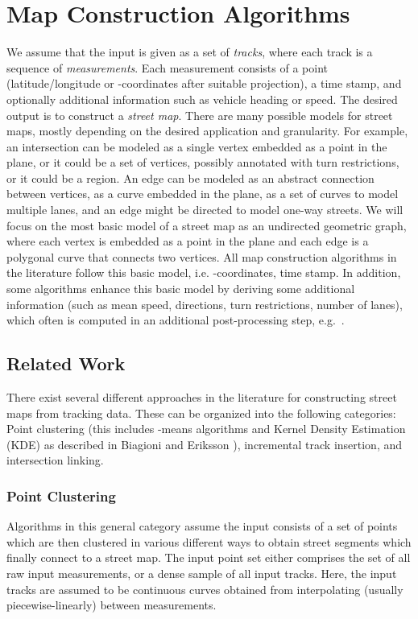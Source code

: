 \documentclass[natbib]{svjour3}                    \smartqed  \usepackage[table]{xcolor}
\begin{document}
\section{Map Construction Algorithms}
\label{sec:sec_mca}

We assume that the input is given as a set of {\em tracks}, where each track is a sequence of {\em measurements}. Each measurement consists of a point (latitude/longitude or -coordinates after suitable projection), a time stamp, and optionally additional information such as vehicle heading or speed. The desired output is to construct a {\em street map}. There are many possible models for street maps, mostly depending on the desired application and granularity. For example, an intersection can be modeled as a single vertex embedded as a point in the plane, or it could be a set of vertices, possibly annotated with turn restrictions, or it could be a region. An edge can be modeled as an abstract connection between vertices, as a curve embedded in the plane, as a set of curves to model multiple lanes, and an edge might be directed to model one-way streets. We will focus on the most basic model of a street map as an undirected geometric graph, where each vertex is embedded as a point in the plane and each edge is a polygonal curve that connects two vertices. All map construction algorithms in the literature follow this basic model, i.e. -coordinates, time stamp.  In addition, some algorithms enhance this basic model by deriving some additional information (such as mean speed, directions, turn restrictions, number of lanes), which often is computed in an additional post-processing step, e.g.~\cite{Biagioni:2012:MIF:2424321.2424333, Cao:2009:GTR:1653771.1653776, Davies:2006:SDR:1175887.1176088, edelkamp:2003:rpmi, schroedl:2004:mgtm}.

\subsection{Related Work}
There exist several different approaches in the literature for constructing street maps from tracking data. These can be organized into the following categories: Point clustering (this includes -means algorithms and Kernel Density Estimation (KDE) as described in Biagioni and Eriksson \cite{Biagioni:2012:MIF:2424321.2424333}), incremental track insertion, and intersection linking.

\subsubsection{Point Clustering} 
Algorithms in this general category assume the input consists of a set of points which are then clustered in various different ways to obtain street segments which finally connect to a street map. The input point set either comprises the set of all raw input measurements, or a dense sample of all input tracks. Here, the input tracks are assumed to be continuous curves obtained from interpolating (usually piecewise-linearly) between measurements. 
\end{document}
